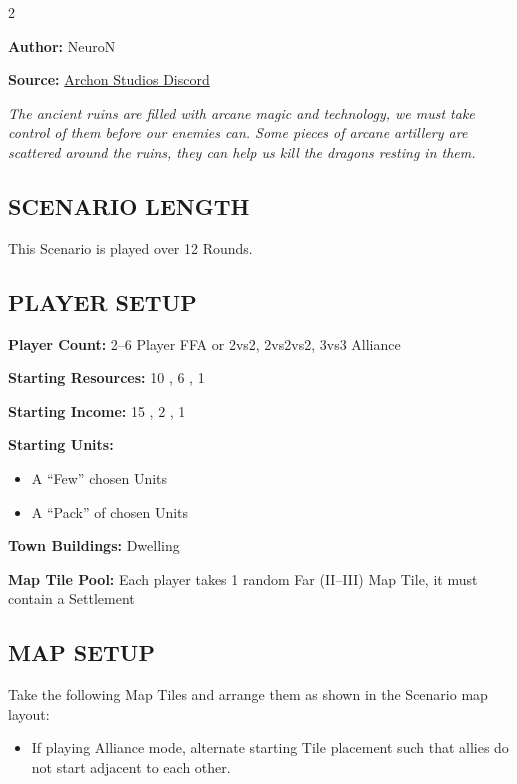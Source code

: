
\begin{multicols}{2}

\textbf{Author:} NeuroN

\textbf{Source:} \href{https://discord.com/channels/740870068178649108/1279029213839626313}{Archon Studios Discord}

\textit{The ancient ruins are filled with arcane magic and technology, we must take control of them before our enemies can.
Some pieces of arcane artillery are scattered around the ruins, they can help us kill the dragons resting in them.}

\subsection*{\MakeUppercase{Scenario Length}}
This Scenario is played over 12 Rounds.

\subsection*{\MakeUppercase{Player Setup}}
\textbf{Player Count:} 2--6 Player FFA or 2vs2, 2vs2vs2, 3vs3 Alliance

\textbf{Starting Resources:} 10 , 6 , 1 

\textbf{Starting Income:} 15 , 2 , 1 

\textbf{Starting Units:}
\begin{itemize}
  \item A ``Few'' chosen  Units
  \item A ``Pack'' of chosen  Units
\end{itemize}

\textbf{Town Buildings:}  Dwelling

\textbf{Map Tile Pool:} Each player takes 1 random Far (II--III) Map Tile, it must contain a Settlement

\subsection*{\MakeUppercase{Map Setup}}
Take the following Map Tiles and arrange them as shown in the Scenario map layout:

\begin{itemize}
  \item If playing Alliance mode, alternate starting Tile placement such that allies do not start adjacent to each other.
\end{itemize}


\end{multicols}
